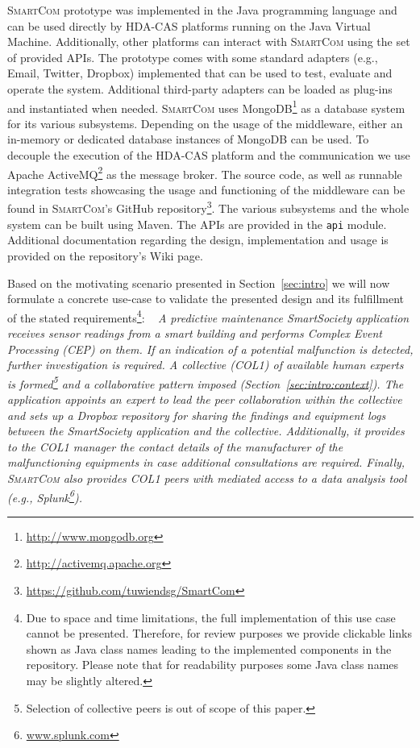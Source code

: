 \documentclass{llncs}
\newcommand{\mdl}{\textsc{SmartCom}}
\begin{document}
  
  \mdl{} prototype
  was implemented in the Java programming language and can be used directly by HDA-CAS platforms running on the Java Virtual Machine. Additionally, other platforms can interact with \mdl{} using the set of provided APIs\footnotemark. 
  The prototype comes with some standard adapters (e.g., Email, Twitter, Dropbox) implemented that can be used to test, evaluate and operate the system.
  Additional third-party adapters can be loaded as plug-ins and instantiated when needed.
  \mdl{} uses MongoDB\footnote{\url{http://www.mongodb.org}} as a database system for its various subsystems. Depending on the usage of the middleware, either an in-memory or dedicated database instances of MongoDB can be used. To decouple the execution of the HDA-CAS platform and the communication we use Apache ActiveMQ\footnote{\url{http://activemq.apache.org}} as the message broker.
  The source code, as well as runnable integration tests showcasing the usage and functioning of the middleware can be found in \mdl's GitHub repository\footnote{\url{https://github.com/tuwiendsg/SmartCom}}. The various subsystems and the whole system can be built using Maven. The APIs are provided in the \texttt{api} module. Additional documentation regarding the design, implementation and usage is provided on the repository's Wiki page. 



    Based on the motivating scenario presented in Section~\ref{sec:intro} we will now formulate a concrete use-case to validate the presented design and its fulfillment of the stated requirements\footnote{Due to space and time limitations, the full implementation of this use case cannot be presented. Therefore, for review purposes we provide clickable links shown as Java class names leading to the implemented components in the repository. Please note that for readability purposes some Java class names may be slightly altered.}:
    ~
    \emph{A predictive maintenance SmartSociety application receives sensor readings from a smart building and performs Complex Event Processing (CEP) on them. If an indication of a potential malfunction is detected, further investigation is required. A collective (COL1) of available human experts is formed\footnote{Selection of collective peers is out of scope of this paper.} and a collaborative pattern imposed (Section~\ref{sec:intro:context}). The application appoints an expert to lead the peer collaboration within the collective and sets up a Dropbox repository for sharing the findings and equipment logs between the SmartSociety application and the collective. Additionally, it provides to the COL1 manager the contact details of the manufacturer of the malfunctioning equipments in case additional consultations are required. Finally, \mdl{} also provides COL1 peers with mediated access to a data analysis tool (e.g., Splunk\footnote{\url{www.splunk.com}}).
    }
\end{document}
